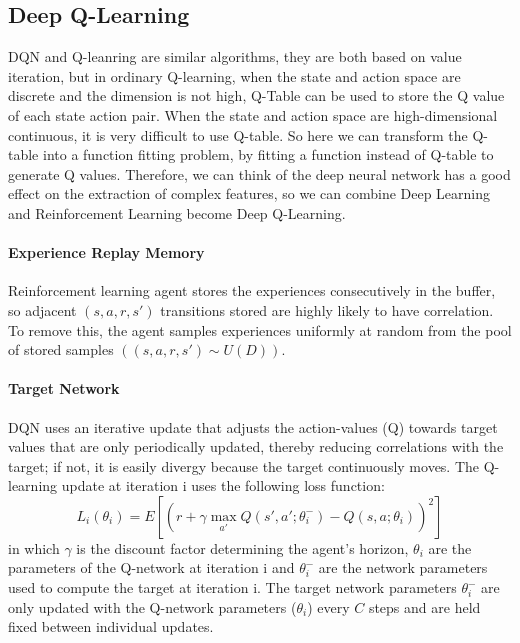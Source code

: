 \documentclass{article}
\begin{document}
\subsection{Deep Q-Learning}
DQN and Q-leanring are similar algorithms, they are both based on value iteration, but in ordinary Q-learning, when the state and action space are discrete and the dimension is not high, Q-Table can be used to store the Q value of each state action pair. 
When the state and action space are high-dimensional continuous, it is very difficult to use Q-table. 
So here we can transform the Q-table into a function fitting problem, by fitting a function  instead of Q-table to generate Q values. Therefore, we can think of the deep neural network has a good effect on the extraction of complex features, so we can combine Deep Learning and Reinforcement Learning become Deep Q-Learning.

\paragraph{Experience Replay Memory} Reinforcement learning agent stores the experiences consecutively in the buffer, so adjacent $(s,a,r,s′)$ transitions stored are highly likely to have correlation. To remove this, the agent samples experiences uniformly at random from the pool of stored samples $((s,a,r,s′) \sim U(D))$.

\paragraph{Target Network} DQN uses an iterative update that adjusts the action-values (Q) towards target values that are only periodically updated, thereby reducing correlations with the target; if not, it is easily divergy because the target continuously moves. The Q-learning update at iteration i uses the following loss function:
$$
L_i(\theta_i) = E[ ( r + \gamma \max_{a'} Q(s',a';\theta_i^-) - Q(s, a; \theta_i) )^2 ]
$$
in which $\gamma$ is the discount factor determining the agent’s horizon, $\theta_i$ are the parameters of the Q-network at iteration i and $\theta_i^-$ are the network parameters used to compute the target at iteration i. The target network parameters $\theta_i^-$ are only updated with the Q-network parameters ($\theta_i$) every $C$ steps and are held fixed between individual updates.
\end{document}
